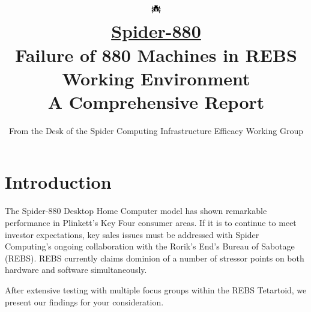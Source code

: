 \documentclass{article}
\title{
\href{https://ambiguousname.itch.io/spider-880}{\includegraphics[scale=5]{../src/icon.png} \\
Spider-880} \\
\large Failure of 880 Machines in REBS Working Environment \\
A Comprehensive Report
}
\author{From the Desk of the Spider Computing Infrastructure Efficacy Working Group}
\date{}
\begin{document}
	\maketitle


\section{Introduction}
The Spider-880 Desktop Home Computer model has shown remarkable performance in Plinkett's Key Four consumer areas. If it is to continue to meet investor expectations, key sales issues must be addressed with Spider Computing's ongoing collaboration with the Rorik's End's Bureau of Sabotage (REBS). REBS currently claims dominion of a number of stressor points on both hardware and software simultaneously.

After extensive testing with multiple focus groups within the REBS Tetartoid, we present our findings for your consideration.
\end{document}
